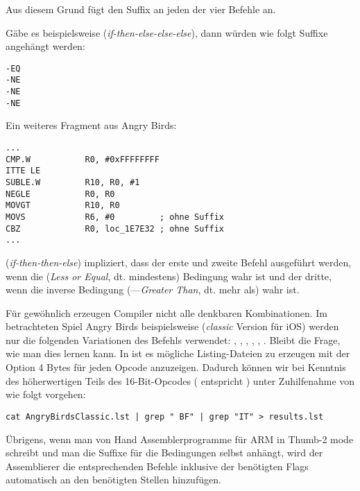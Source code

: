 Aus diesem Grund fügt \IDA den  Suffix an jeden der vier Befehle an.

Gäbe es beispielsweise  (\emph{if-then-else-else-else}), dann würden wie folgt Suffixe angehängt werden:

\begin{lstlisting}
-EQ
-NE
-NE
-NE
\end{lstlisting}

Ein weiteres Fragment aus Angry Birds:

\begin{lstlisting}[caption=Angry Birds Classic,style=customasmARM]
...
CMP.W           R0, #0xFFFFFFFF
ITTE LE
SUBLE.W         R10, R0, #1
NEGLE           R0, R0
MOVGT           R10, R0
MOVS            R6, #0         ; ohne Suffix
CBZ             R0, loc_1E7E32 ; ohne Suffix
...
\end{lstlisting}

 (\emph{if-then-then-else}) impliziert, dass der erste und zweite Befehl ausgeführt werden, wenn die 
(\emph{Less or Equal}, dt. mindestens) Bedingung wahr ist und der dritte, wenn die inverse Bedingung
(---\emph{Greater Than}, dt. mehr als) wahr ist.

Für gewöhnlich erzeugen Compiler nicht alle denkbaren Kombinationen.
Im betrachteten Spiel Angry Birds beispielsweise (\emph{classic} Version für iOS) werden nur die folgenden Variationen des
 Befehls verwendet:
, , , , , .
\myindex{\GrepUsage}
Bleibt die Frage, wie man dies lernen kann. 
In \IDA ist es mögliche Listing-Dateien zu erzeugen mit der Option 4 Bytes für jeden Opcode anzuzeigen. 
Dadurch können wir bei Kenntnis des höherwertigen Teils des 16-Bit-Opcodes ( entspricht ) unter
Zuhilfenahme von  wie folgt vorgehen:

\begin{lstlisting}
cat AngryBirdsClassic.lst | grep " BF" | grep "IT" > results.lst
\end{lstlisting}

Übrigens, wenn man von Hand Assemblerprogramme für ARM in Thumb-2 mode schreibt und man die Suffixe für die Bedingungen
selbst anhängt, wird der Assemblierer die entsprechenden  Befehle inklusive der benötigten Flags automatisch an
den benötigten Stellen hinzufügen.

\myparagraph{\NonOptimizingXcodeIV (\ARMMode)}

